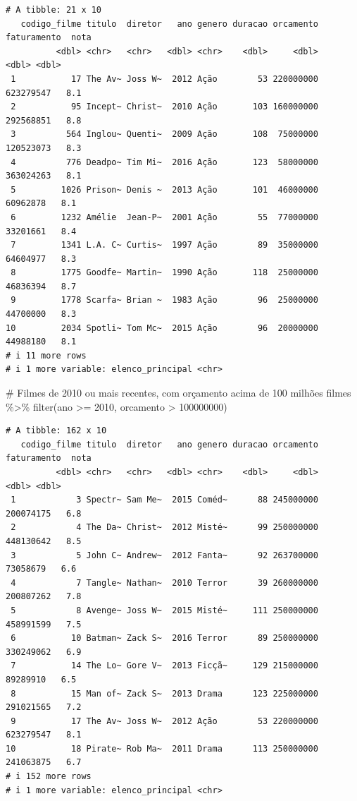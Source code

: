 \documentclass[
  letterpaper,
]{scrbook}
\newenvironment{Shaded}{\begin{snugshade}}{\end{snugshade}}
\newcommand{\CommentTok}[1]{\textcolor[rgb]{0.37,0.37,0.37}{#1}}
\newcommand{\DecValTok}[1]{\textcolor[rgb]{0.68,0.00,0.00}{#1}}
\newcommand{\FunctionTok}[1]{\textcolor[rgb]{0.28,0.35,0.67}{#1}}
\newcommand{\NormalTok}[1]{\textcolor[rgb]{0.00,0.23,0.31}{#1}}
\newcommand{\SpecialCharTok}[1]{\textcolor[rgb]{0.37,0.37,0.37}{#1}}
\begin{document}
\begin{verbatim}
# A tibble: 21 x 10
   codigo_filme titulo  diretor   ano genero duracao orcamento faturamento  nota
          <dbl> <chr>   <chr>   <dbl> <chr>    <dbl>     <dbl>       <dbl> <dbl>
 1           17 The Av~ Joss W~  2012 Ação        53 220000000   623279547   8.1
 2           95 Incept~ Christ~  2010 Ação       103 160000000   292568851   8.8
 3          564 Inglou~ Quenti~  2009 Ação       108  75000000   120523073   8.3
 4          776 Deadpo~ Tim Mi~  2016 Ação       123  58000000   363024263   8.1
 5         1026 Prison~ Denis ~  2013 Ação       101  46000000    60962878   8.1
 6         1232 Amélie  Jean-P~  2001 Ação        55  77000000    33201661   8.4
 7         1341 L.A. C~ Curtis~  1997 Ação        89  35000000    64604977   8.3
 8         1775 Goodfe~ Martin~  1990 Ação       118  25000000    46836394   8.7
 9         1778 Scarfa~ Brian ~  1983 Ação        96  25000000    44700000   8.3
10         2034 Spotli~ Tom Mc~  2015 Ação        96  20000000    44988180   8.1
# i 11 more rows
# i 1 more variable: elenco_principal <chr>
\end{verbatim}

\begin{Shaded}
\begin{Highlighting}[]
\CommentTok{\# Filmes de 2010 ou mais recentes, com orçamento acima de 100 milhões}
\NormalTok{filmes }\SpecialCharTok{\%\textgreater{}\%} 
  \FunctionTok{filter}\NormalTok{(ano }\SpecialCharTok{\textgreater{}=} \DecValTok{2010}\NormalTok{, orcamento }\SpecialCharTok{\textgreater{}} \DecValTok{100000000}\NormalTok{)}
\end{Highlighting}
\end{Shaded}

\begin{verbatim}
# A tibble: 162 x 10
   codigo_filme titulo  diretor   ano genero duracao orcamento faturamento  nota
          <dbl> <chr>   <chr>   <dbl> <chr>    <dbl>     <dbl>       <dbl> <dbl>
 1            3 Spectr~ Sam Me~  2015 Coméd~      88 245000000   200074175   6.8
 2            4 The Da~ Christ~  2012 Misté~      99 250000000   448130642   8.5
 3            5 John C~ Andrew~  2012 Fanta~      92 263700000    73058679   6.6
 4            7 Tangle~ Nathan~  2010 Terror      39 260000000   200807262   7.8
 5            8 Avenge~ Joss W~  2015 Misté~     111 250000000   458991599   7.5
 6           10 Batman~ Zack S~  2016 Terror      89 250000000   330249062   6.9
 7           14 The Lo~ Gore V~  2013 Ficçã~     129 215000000    89289910   6.5
 8           15 Man of~ Zack S~  2013 Drama      123 225000000   291021565   7.2
 9           17 The Av~ Joss W~  2012 Ação        53 220000000   623279547   8.1
10           18 Pirate~ Rob Ma~  2011 Drama      113 250000000   241063875   6.7
# i 152 more rows
# i 1 more variable: elenco_principal <chr>
\end{verbatim}
\end{document}
